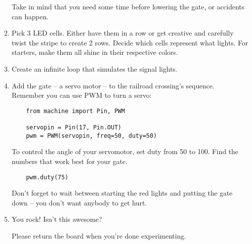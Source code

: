 \documentclass{../tutorial}
\begin{document}
\begin{enumerate}
    Take in mind that you need some time before lowering the gate,
    or accidents can happen.

\item
    Pick 3 LED cells.
    Either have them in a row or get creative and carefully twist the stripe
    to create 2 rows.
    Decide which cells represent what lights.
    For starters, make them all shine in their respective colors.

\item
    Create an infinite loop that simulates the signal lights.

\item
    Add the gate – a servo motor – to the railroad crossing's sequence.
    Remember you can use PWM to turn a servo:

    \begin{lstlisting}
    from machine import Pin, PWM

    servopin = Pin(17, Pin.OUT)
    pwm = PWM(servopin, freq=50, duty=50)
    \end{lstlisting}

    To control the angle of your servomotor, set duty from 50 to 100.
    Find the numbers that work best for your gate.

    \begin{lstlisting}
    pwm.duty(75)
    \end{lstlisting}

    Don't forget to wait between starting the red lights and putting the gate down –
    you don't want anybody to get hurt.

\item
    You rock! Isn't this awesome?

    Please return the board when you're done experimenting.

\end{enumerate}
\end{document}
